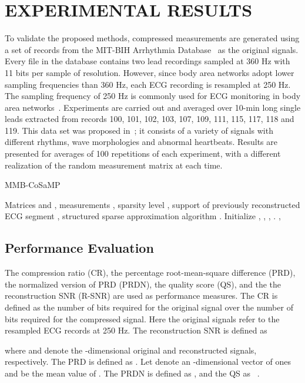 \documentclass[journal]{IEEEtran}
\begin{document}
\section{EXPERIMENTAL RESULTS}
To validate the proposed methods, compressed measurements are generated using a set of records from the MIT-BIH Arrhythmia Database~\cite{Gold00} as the original signals. Every file in the database contains two lead recordings sampled at 360 Hz with 11 bits per sample of resolution. However, since body area networks adopt lower sampling frequencies than 360 Hz, each ECG recording is resampled at 250 Hz. The sampling frequency of 250 Hz is commonly used for ECG monitoring in body area networks~\cite{Pant10}. Experiments are carried out and averaged over 10-min long single leads extracted from records 100, 101, 102, 103, 107, 109, 111, 115, 117, 118 and 119. This data set was proposed in~\cite{Zhita00}; it consists of a variety of signals with different rhythms, wave morphologies and abnormal heartbeats. Results are presented for averages of 100 repetitions of each experiment, with a different realization of the random measurement matrix at each time.
\begin{algorithm}[t]
\caption{MMB-CoSaMP}\label{alg:alg1}
\begin{algorithmic}[1]
\REQUIRE Matrices  and , measurements , sparsity level , support of previously reconstructed ECG segment , structured sparse approximation algorithm .
\STATE Initialize , , , .
\STATE 
\STATE 
\STATE 
\STATE 
\STATE , 
\STATE 
\STATE 
\ENDWHILE
\RETURN 
\end{algorithmic}
\end{algorithm}

\subsection{Performance Evaluation}
The compression ratio (CR), the percentage root-mean-square difference (PRD), the normalized version of PRD (PRDN), the quality score (QS), and the the reconstruction SNR (R-SNR) are used as performance measures. The CR is defined as the number of bits required for the original signal over the number of bits required for the compressed signal. Here the original signals refer to the resampled ECG records at 250 Hz. The reconstruction SNR is defined as

where  and  denote the -dimensional original and reconstructed signals, respectively. The PRD is defined as . Let  denote an -dimensional vector of ones and  be the mean value of . The PRDN is defined as , and the QS as ~\cite{Fira08}.
\end{document}
